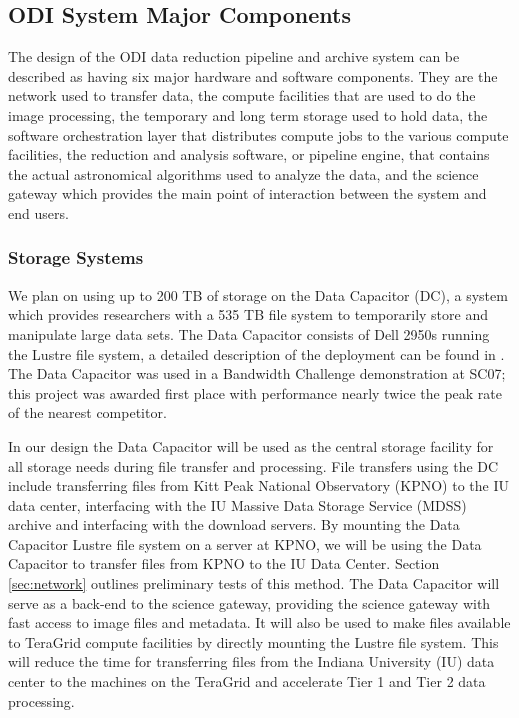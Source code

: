 \documentclass[10pt,conference]{IEEEtran}
\begin{document}
\subsection{ODI System Major Components}\label{sec:components}

The design of the ODI data reduction pipeline and archive system can be described as having six major hardware and software components. They are the network used to transfer data, the compute facilities that are used to do the image processing, the temporary and long term storage used to hold data, the software orchestration layer that distributes compute jobs to the various compute facilities, the reduction and analysis software, or pipeline engine, that contains the actual astronomical algorithms used to analyze the data, and the science gateway which provides the main point of interaction between the system and end users. 

\subsubsection{Storage Systems}

We plan on using up to 200 TB of storage on the Data Capacitor (DC), a system which provides researchers with a 535 TB file system to temporarily store and manipulate large data sets. The Data Capacitor consists of Dell 2950s running the Lustre file system, a detailed description of the deployment can be found in \cite{simms2007}. The Data Capacitor was used in a Bandwidth Challenge demonstration at SC07; this project was awarded first place with performance nearly twice the peak rate of the nearest competitor.

In our design the Data Capacitor will be used as the central storage facility for all storage needs during file transfer and processing. File transfers using the DC include transferring files from Kitt Peak National Observatory (KPNO) to the IU data center, interfacing with the IU Massive Data Storage Service (MDSS) \cite{mdss} archive and interfacing with the download servers. By mounting the Data Capacitor Lustre file system on a server at KPNO, we will be using the Data Capacitor to transfer files from KPNO to the IU Data Center. Section \ref{sec:network} outlines preliminary tests of this method. The Data Capacitor will serve as a back-end to the science gateway, providing the science gateway with fast access to image files and metadata. It will also be used to make files available to TeraGrid compute facilities by directly mounting the Lustre file system. This will reduce the time for transferring files from the Indiana University (IU) data center to the machines on the TeraGrid and accelerate Tier 1 and Tier 2 data processing.
\end{document}
